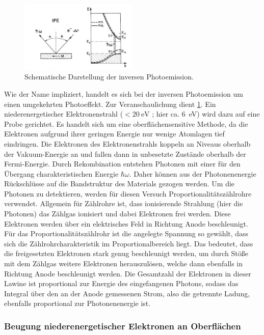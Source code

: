 \begin{figure}[!ht]
    \centering
    \includegraphics[width=0.5\textwidth]{img/ipe_theo.png}
    \caption{Schematische Darstellung der inversen Photoemission.\cite{donath}}
    \label{fig_ipe_theo}
\end{figure}
Wie der Name impliziert, handelt es sich bei der inversen Photoemission um einen umgekehrten Photoeffekt.
Zur Veranschaulichung dient \cref{fig_ipe_theo}.
Ein niederenergetischer Elektronenstrahl ($<\SI{20}{\electronvolt}$ \cite{wiki_ipe}; hier ca. \SI{6}{\electronvolt}) wird dazu auf eine Probe gerichtet.
Es handelt sich um eine oberflächensensitive Methode, da die Elektronen aufgrund ihrer geringen Energie nur wenige Atomlagen tief eindringen.
Die Elektronen des Elektronenstrahls koppeln an Niveaus oberhalb der Vakuum-Energie an und fallen dann in unbesetzte Zustände oberhalb der Fermi-Energie.
Durch Rekombination entstehen Photonen mit einer für den Übergang charakteristischen Energie $\hbar\omega$.
Daher können aus der Photonenenergie Rückschlüsse auf die Bandstruktur des Materials gezogen werden.
Um die Photonen zu detektieren, werden für diesen Versuch Proportionalitätszählrohre verwendet.
Allgemein für Zählrohre ist, dass ionisierende Strahlung (hier die Photonen) das Zählgas ionisiert und dabei Elektronen frei werden.
Diese Elektronen werden über ein elektrisches Feld in Richtung Anode beschleunigt.
Für das Proportionalitätszählrohr ist die angelegte Spannung so gewählt, dass sich die Zählrohrcharakteristik im Proportionalbereich liegt.
Das bedeutet, dass die freigesetzten Elektronen stark genug beschleunigt werden, um durch Stöße mit dem Zählgas weitere Elektronen herauszulösen, welche dann ebenfalls in Richtung Anode beschleunigt werden.
Die Gesamtzahl der Elektronen in dieser Lawine ist proportional zur Energie des eingefangenen Photons, sodass das Integral über den an der Anode gemessenen Strom, also die getrennte Ladung, ebenfalls proportional zur Photonenenergie ist.

\subsubsection{Beugung niederenergetischer Elektronen an Oberflächen}


